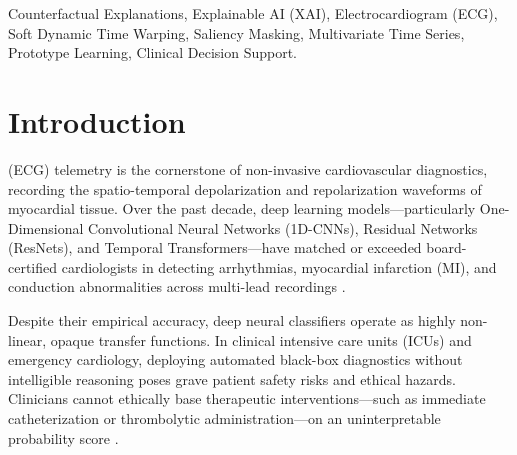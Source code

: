 \documentclass[conference]{IEEEtran}
\begin{document}
\begin{IEEEkeywords}
Counterfactual Explanations, Explainable AI (XAI), Electrocardiogram (ECG), Soft Dynamic Time Warping, Saliency Masking, Multivariate Time Series, Prototype Learning, Clinical Decision Support.
\end{IEEEkeywords}

\section{Introduction}
 (ECG) telemetry is the cornerstone of non-invasive cardiovascular diagnostics, recording the spatio-temporal depolarization and repolarization waveforms of myocardial tissue. Over the past decade, deep learning models—particularly One-Dimensional Convolutional Neural Networks (1D-CNNs), Residual Networks (ResNets), and Temporal Transformers—have matched or exceeded board-certified cardiologists in detecting arrhythmias, myocardial infarction (MI), and conduction abnormalities across multi-lead recordings \cite{ismail2019deep, rajpurkar2017cardiologist, strodthoff2020deep}. 

Despite their empirical accuracy, deep neural classifiers operate as highly non-linear, opaque transfer functions. In clinical intensive care units (ICUs) and emergency cardiology, deploying automated black-box diagnostics without intelligible reasoning poses grave patient safety risks and ethical hazards. Clinicians cannot ethically base therapeutic interventions—such as immediate catheterization or thrombolytic administration—on an uninterpretable probability score \cite{guidotti2018survey, caruana2015intelligible}.
\end{document}
